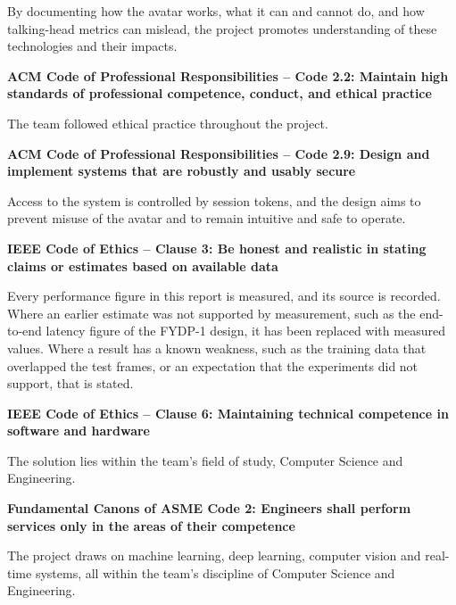 \noindent
By documenting how the avatar works, what it can and cannot do, and how talking-head metrics can mislead, the project promotes understanding of these technologies and their impacts.

\vspace{0.5cm}


\textbf{ACM Code of Professional Responsibilities -- Code 2.2: Maintain high standards of professional competence, conduct, and ethical practice}

\noindent
The team followed ethical practice throughout the project.

\vspace{0.5cm}


\textbf{ACM Code of Professional Responsibilities -- Code 2.9: Design and implement systems that are robustly and usably secure}

\noindent
Access to the system is controlled by session tokens, and the design aims to prevent misuse of the avatar and to remain intuitive and safe to operate.

\vspace{0.5cm}


\textbf{IEEE Code of Ethics -- Clause 3: Be honest and realistic in stating claims or estimates based on available data}

\noindent
Every performance figure in this report is measured, and its source is recorded. Where an earlier estimate was not supported by measurement, such as the end-to-end latency figure of the FYDP-1 design, it has been replaced with measured values. Where a result has a known weakness, such as the training data that overlapped the test frames, or an expectation that the experiments did not support, that is stated.

\vspace{0.5cm}


\textbf{IEEE Code of Ethics -- Clause 6: Maintaining technical competence in software and hardware}

\noindent
The solution lies within the team's field of study, Computer Science and Engineering.

\vspace{0.5cm}


\textbf{Fundamental Canons of ASME Code 2: Engineers shall perform services only in the areas of their competence}

\noindent
The project draws on machine learning, deep learning, computer vision and real-time systems, all within the team's discipline of Computer Science and Engineering.



